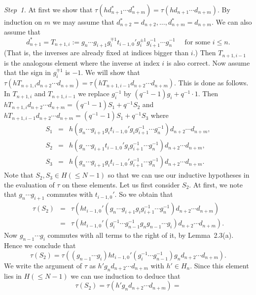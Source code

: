 \begin{pf}
\medskip
{\em Step~1.} At first we show that $\tau(hd_{n+1}^{*} \cdots d_{n+m}^{*})
=\tau(hd_{n+1} \cdots d_{n+m})$. By induction on $m$ we may assume
that $d_{n+2}^{*}=d_{n+2},\ldots, d_{n+m}^{*}=d_{n+m}$. We can also assume
that
\[d_{n+1}^{*}=T_{n+1,i}:=g_{n} \cdots g_{i+1}g_i^{\mp 1}t_{i-1,0}'
g_i^{\pm 1}g_{i+1}^{-1} \cdots g_{n}^{-1} \quad \mbox{ for some  $i \leq n$}.
\]
(That is, the inverses are already fixed at  indices   bigger than $i$.)    
Then $T_{n+1,i-1}$ is  the analogous element where  the inverse at index  
$i$ is also  correct.  Now assume that the sign in $g_i^{\mp 1}$ is $-1$.
We will show that $\tau(hT_{n+1,i}d_{n+2} \cdots d_{n+m})=\tau(hT_{n+1,i-1}
d_{n+2} \cdots d_{n+m})$.  This is done as follows.  In $T_{n+1,i}$  and 
$T_{n+1,i-1}$ we  replace $g_i^{-1}$ by $(q^{-1}-1)g_i+q^{-1} \cdot 1$. 
Then $hT_{n+1,i}d_{n+2} \cdots d_{n+m}=(q^{-1}-1)S_1+ q^{-1}S_2$ and 
$hT_{n+1,i-1}d_{n+2} \cdots d_{n+m}=(q^{-1}-1)S_1+q^{-1}S_3$ where
\begin{eqnarray*}
S_1 & = & h (g_n \cdots g_{i+1}g_i t_{i-1,0}'g_ig_{i+1}^{-1} \cdots g_n^{-1})
                    d_{n+2} \cdots d_{n+m},\\
S_2 & = & h (g_n \cdots g_{i+1}t_{i-1,0}'g_ig_{i+1}^{-1} \cdots g_n^{-1}) 
                    d_{n+2} \cdots d_{n+m},\\
S_3 & = & h (g_n \cdots g_{i+1}g_it_{i-1,0}'g_{i+1}^{-1} \cdots g_n^{-1})
                    d_{n+2} \cdots d_{n+m}.
\end{eqnarray*}
Note that $S_2,S_3 \in H(\leq N-1)$ so that we can use our inductive
hypotheses in the evaluation of $\tau$ on these elements.
Let us first consider $S_2$. At first, we note that $g_n \cdots g_{i+1}$
commutes with $t_{i-1,0}'$. So we obtain that
\begin{eqnarray*}
\tau(S_2) & = & \tau(ht_{i-1,0}'(g_n \cdots g_{i+1}g_ig_{i+1}^{-1} 
               \cdots g_n^{-1})d_{n+2} \cdots d_{n+m}) \\
    & = & \tau(ht_{i-1,0}' (g_i^{-1} \cdots g_{n-1}^{-1}g_ng_{n-1} 
                    \cdots g_i)d_{n+2} \cdots d_{n+m}).\end{eqnarray*}
Now $g_{n-1} \cdots g_{i}$ commutes with all terms to the right of it,
by Lemma~2.3(a). Hence we conclude that
\[ \tau(S_2)= \tau((g_{n-1} \cdots g_i)ht_{i-1,0}' (g_i^{-1} 
         \cdots g_{n-1}^{-1})g_nd_{n+2} \cdots d_{n+m}). \]
We write the argument of $\tau$ as $h'g_nd_{n+2} \cdots 
d_{n+m}$ with $h' \in H_n$. Since this element lies in $H(\leq N-1)$
we can use induction to deduce that 
\[\tau(S_2)=\tau(h'g_nd_{n+2} \cdots d_{n+m})= 
\]
\end{pf}
